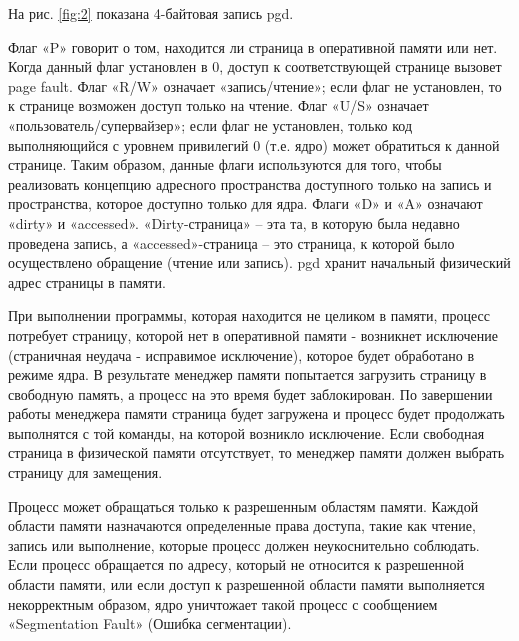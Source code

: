 На рис. \ref{fig:2} показана 4-байтовая запись pgd.

\begin{figure}[ht!]
\end{figure}

Флаг «P» говорит о том, находится ли страница в оперативной памяти или нет.
Когда данный флаг установлен в 0, доступ к соответствующей странице вызовет page fault.
Флаг «R/W» означает «запись/чтение»; если флаг не установлен, то к странице возможен доступ только на чтение.
Флаг «U/S» означает «пользователь/супервайзер»; если флаг не установлен, только код выполняющийся 
с уровнем привилегий 0 (т.е. ядро) может обратиться к данной странице.
Таким образом, данные флаги используются для того, чтобы реализовать концепцию адресного 
пространства доступного только на запись и пространства, которое доступно только для ядра.
Флаги «D» и «A» означают «dirty» и «accessed». «Dirty-страница» – эта та, в которую была недавно проведена запись, 
а «accessed»-страница – это страница, к которой было осуществлено обращение (чтение или запись). 
pgd хранит начальный физический адрес страницы в памяти.

При выполнении программы, которая находится не целиком в памяти, процесс потребует страницу, 
которой нет в оперативной памяти - возникнет исключение (страничная неудача - исправимое исключение), 
которое будет обработано в режиме ядра. В результате менеджер памяти попытается загрузить страницу 
в свободную память, а процесс на это время будет заблокирован. По завершении работы менеджера памяти страница
будет загружена и процесс будет продолжать выполнятся с той команды, на которой возникло исключение. 
Если свободная страница в физической памяти отсутствует, то менеджер памяти должен выбрать страницу для замещения.

Процесс может обращаться только к разрешенным областям памяти. 
Каждой области памяти назначаются определенные права доступа, такие как чтение, запись 
или выполнение, которые процесс должен неукоснительно соблюдать. 
Если процесс обращается по адресу, который не относится к разрешенной области памяти, 
или если доступ к разрешенной области памяти выполняется некорректным образом, ядро уничтожает такой
процесс с сообщением «Segmentation Fault» (Ошибка сегментации).

